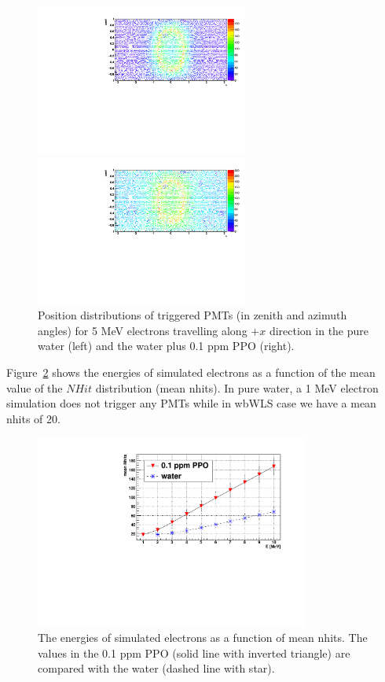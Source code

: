 \begin{figure}[htbp]
	\centering
	\begin{minipage}[t]{0.48\textwidth}
		\centering
		\includegraphics[width=7cm]{PMT_5MeVElectronWater.pdf}
	\end{minipage}
	\begin{minipage}[t]{0.48\textwidth}
		\centering
		\includegraphics[width=7cm]{PMT_5MeVElectron0p1ppmPPO.pdf}
	\end{minipage}
	\caption{Position distributions of triggered PMTs (in zenith and azimuth angles) for 5 MeV electrons travelling along $+x$ direction in the pure water (left) and the water plus 0.1 ppm PPO (right).}
	\label{pmt_wls}
\end{figure}

Figure~\ref{nhit_wls} shows the energies of simulated electrons as a function of the mean value of the $NHit$ distribution (mean nhits). In pure water, a 1 MeV electron simulation does not trigger any PMTs while in wbWLS case we have a mean nhits of 20.

\begin{figure}[htbp]
	\centering	
	\includegraphics[width=9cm]{nhits_wls.pdf}
	\caption{ The energies of simulated electrons as a function of mean nhits. The values in the 0.1 ppm PPO (solid line with inverted triangle) are compared with the water (dashed line with star).}
	\label{nhit_wls}
\end{figure}

